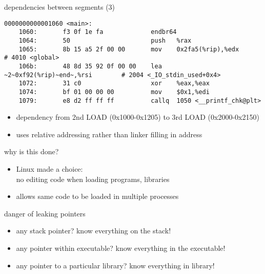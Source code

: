\begin{frame}[fragile,label=betweenSegments3]{dependencies between segments (3)}
\begin{lstlisting}[language={},style=smaller,moredelim={**[is][\btHL<1->]{~2~}{~end~}}]
0000000000001060 <main>:
    1060:       f3 0f 1e fa             endbr64 
    1064:       50                      push   %rax
    1065:       8b 15 a5 2f 00 00       mov    0x2fa5(%rip),%edx        # 4010 <global>
    106b:       48 8d 35 92 0f 00 00    lea    ~2~0xf92(%rip)~end~,%rsi        # 2004 <_IO_stdin_used+0x4>
    1072:       31 c0                   xor    %eax,%eax
    1074:       bf 01 00 00 00          mov    $0x1,%edi
    1079:       e8 d2 ff ff ff          callq  1050 <__printf_chk@plt>
\end{lstlisting}
\begin{itemize}
\item dependency from 2nd LOAD (0x1000-0x1205) to 3rd LOAD (0x2000-0x2150)
\item uses relative addressing rather than linker filling in address
\end{itemize}
\end{frame}

\begin{frame}[fragile,label=whyRipRelative]{why is this done?}
\begin{itemize}
\item Linux made a choice: \\
no editing code when loading programs, libraries\
\vspace{.5cm}
\item allows same code to be loaded in multiple processes
\end{itemize}
\end{frame}

\begin{frame}[fragile,label=noGuessing]{danger of leaking pointers}
    \begin{itemize}
        \item any stack pointer? know everything on the stack!
        \item any pointer within executable? know everything in the executable!
        \item any pointer to a particular library? know everything in library!
    \end{itemize}
\end{frame}
